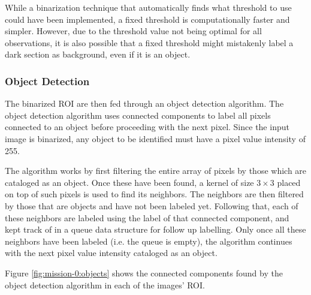 While a binarization technique that automatically finds what threshold to use could have been implemented, a fixed threshold is computationally faster and simpler. However, due to the threshold value not being optimal for all observations, it is also possible that a fixed threshold might mistakenly label a dark section as background, even if it is an object.

\subsubsection{Object Detection} \label{subsubsect:case-study:impl:objects}
The binarized ROI are then fed through an object detection algorithm. The object detection algorithm uses connected components to label all pixels connected to an object before proceeding with the next pixel. Since the input image is binarized, any object to be identified must have a pixel value intensity of 255. \newline

The algorithm works by first filtering the entire array of pixels by those which are cataloged as an object. Once these have been found, a kernel of size $3 \times 3$ placed on top of such pixels is used to find its neighbors. The neighbors are then filtered by those that are objects and have not been labeled yet. Following that, each of these neighbors are labeled using the label of that connected component, and kept track of in a queue data structure for follow up labelling. Only once all these neighbors have been labeled (i.e. the queue is empty), the algorithm continues with the next pixel value intensity cataloged as an object. \newline

Figure \ref{fig:mission-0:objects} shows the connected components found by the object detection algorithm in each of the images' ROI.

